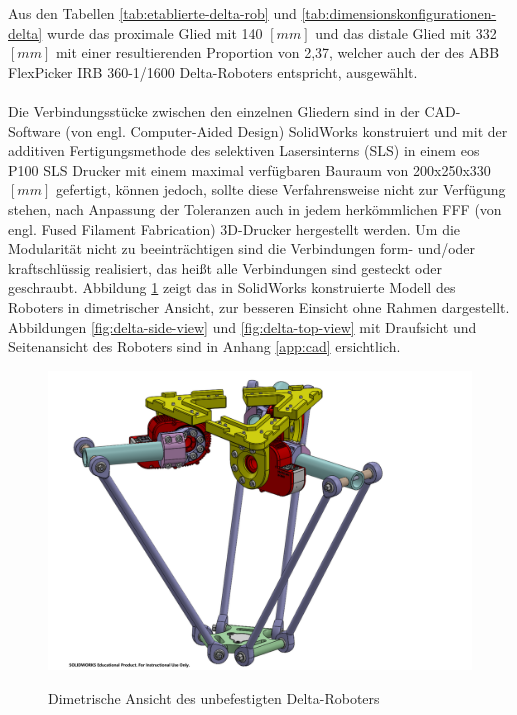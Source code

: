 \documentclass[Bachelor, BMR, ngerman]{twbook}
\begin{document}
    \noindent
    Aus den Tabellen \ref{tab:etablierte-delta-rob} und \ref{tab:dimensionskonfigurationen-delta} wurde das proximale Glied mit 140 $[mm]$ und das distale Glied mit 332 $[mm]$ mit einer resultierenden Proportion von 2,37, welcher auch der des ABB FlexPicker IRB 360-1/1600 Delta-Roboters entspricht, ausgewählt.\\
    \\
    Die Verbindungsstücke zwischen den einzelnen Gliedern sind in der CAD-Software (von engl. Computer-Aided Design) SolidWorks konstruiert und mit der additiven Fertigungsmethode des selektiven Lasersinterns (SLS) in einem eos P100 SLS Drucker mit einem maximal verfügbaren Bauraum von 200x250x330 $[mm]$ gefertigt, können jedoch, sollte diese Verfahrensweise nicht zur Verfügung stehen, nach Anpassung der Toleranzen auch in jedem herkömmlichen FFF (von engl. Fused Filament Fabrication) 3D-Drucker hergestellt werden. Um die Modularität nicht zu beeinträchtigen sind die Verbindungen form- und/oder kraftschlüssig realisiert, das heißt alle Verbindungen sind gesteckt oder geschraubt. Abbildung \ref{fig:delta-unattached-dimetric-view} zeigt das in SolidWorks konstruierte Modell des Roboters in dimetrischer Ansicht, zur besseren Einsicht ohne Rahmen dargestellt. Abbildungen \ref{fig:delta-side-view} und \ref{fig:delta-top-view} mit Draufsicht und Seitenansicht des Roboters sind in Anhang \ref{app:cad} ersichtlich.
    \begin{figure}[H]
      \centering
      {
        \includegraphics[width=\linewidth]{delta-unattached-dimetric-view.PDF}
      }
      \caption[Dimetrische Ansicht des unbefestigten Delta-Roboters]{Dimetrische Ansicht des unbefestigten Delta-Roboters}
      \label{fig:delta-unattached-dimetric-view}
    \end{figure}
\end{document}
